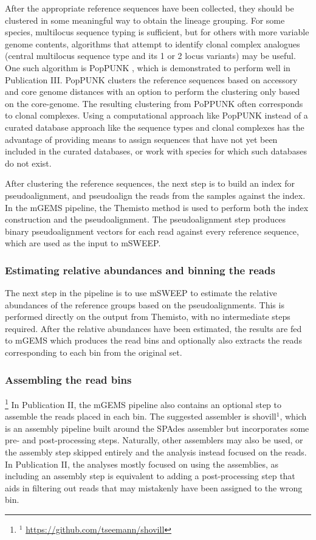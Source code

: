 \documentclass[officiallayout]{tktla}
\begin{document}
After the appropriate reference sequences have been collected, they
should be clustered in some meaningful way to obtain the lineage
grouping. For some species, multilocus sequence typing is sufficient,
but for others with more variable genome contents, algorithms that
attempt to identify clonal complex analogues (central multilocus
sequence type and its 1 or 2 locus variants) may be useful. One such
algorithm is PopPUNK \citep{lees2019fast}, which is demonstrated to
perform well in Publication III. PopPUNK clusters the
reference sequences based on accessory and core genome distances with
an option to perform the clustering only based on the core-genome. The
resulting clustering from PoPPUNK often corresponds to clonal
complexes. Using a computational approach like PopPUNK instead of a curated
database approach like the sequence types and clonal complexes has the
advantage of providing means to assign sequences that have not yet
been included in the curated databases, or work with species for which
such databases do not exist.

After clustering the reference sequences, the next step is to build an
index for pseudoalignment, and pseudoalign the reads from the samples
against the index. In the mGEMS pipeline, the Themisto method is used
\citep{maklin_bacterial_2021} to perform both the index construction
and the pseudoalignment. The pseudoalignment step produces binary
pseudoalignment vectors for each read against every reference
sequence, which are used as the input to mSWEEP.

\subsubsection{Estimating relative abundances and binning the reads}

The next step in the pipeline is to use mSWEEP to estimate the
relative abundances of the reference groups based on the
pseudoalignments. This is performed directly on the output from
Themisto, with no intermediate steps required. After the relative
abundances have been estimated, the results are fed to mGEMS which
produces the read bins and optionally also extracts the reads
corresponding to each bin from the original set.

\subsubsection{Assembling the read bins}

\noindent\let\thefootnote\relax\footnote{$^{1}$ \url{https://github.com/tseemann/shovill}}
In Publication II, the mGEMS pipeline also contains an optional step
to assemble the reads placed in each bin. The suggested assembler is
shovill$^{1}$, which is an assembly pipeline built around the SPAdes
assembler \citep{prjibelski2020using} but incorporates some pre- and
post-processing steps. Naturally, other assemblers may also be used,
or the assembly step skipped entirely and the analysis instead focused
on the reads. In Publication II, the analyses mostly focused on using
the assemblies, as including an assembly step is equivalent to adding
a post-processing step that aids in filtering out reads that may
mistakenly have been assigned to the wrong bin.
\end{document}
